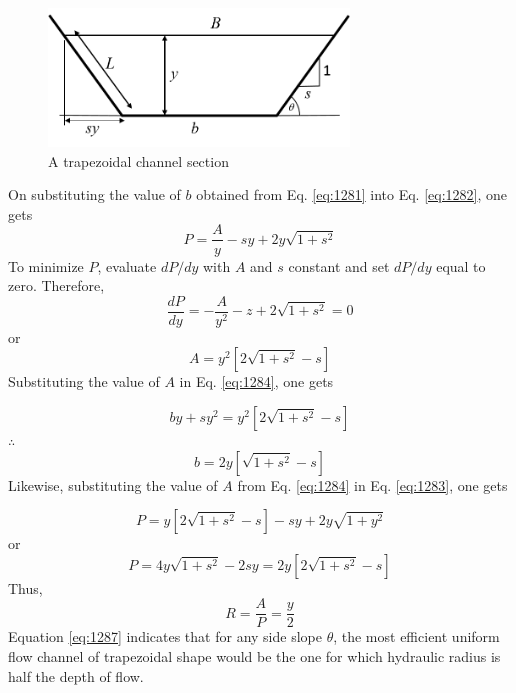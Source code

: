 \documentclass[a4paper, 12pt, british]{article} %
\numberwithin{equation}{section}
\numberwithin{figure}{section}
\numberwithin{table}{section}
\begin{document}
\begin{figure}[H]
	\centering
	\includegraphics[width=8cm]{./images/section_trap_2018_a.png}
	\caption{A trapezoidal channel section}
	\label{fig:section_trap_2018}
\end{figure}
On substituting the value of $b$ obtained from Eq. \ref{eq:1281}
into Eq. \ref{eq:1282}, one gets
\begin{equation}
P = \frac{A}{y} - sy +2y \sqrt{1 + s^2}
\label{eq:1283}
\end{equation}	
To minimize $P$, evaluate $dP/dy$ with $A$ and $s$ constant
and set $dP/dy$ equal to zero. Therefore, 
\begin{equation*}
\frac{dP}{dy} = -\frac{A}{y^2} - z + 2 \sqrt{1 + s^2} = 0
\end{equation*}
or
\begin{equation}
A = y^2 \left [ 2 \sqrt{1 + s^2} - s \right ]
\label{eq:1284}
\end{equation}
Substituting the value of $A$ in Eq. \ref{eq:1284}, one gets 

\begin{equation*}
by + sy^2 = y^2 \left [ 2 \sqrt{1 + s^2} - s \right ]
\end{equation*}
$\therefore$
\begin{equation}
b = 2y  \left [ \sqrt{1 + s^2} - s \right ]
\label{eq:1285}
\end{equation}
Likewise, substituting the value of $A$ from Eq. \ref{eq:1284} in
Eq. \ref{eq:1283}, one gets

\begin{equation*}
P = y \left [ 2 \sqrt{1 + s^2} - s \right ] - sy + 2y \sqrt{1 + y^2}
\end{equation*}
or
\begin{equation}
P = 4y \sqrt{1 + s^2} - 2sy = 2y\left [ 2 \sqrt{1 + s^2} - s \right ]
\label{eq:1286}
\end{equation}
Thus,
\begin{equation}
R = \frac{A}{P} = \frac{y}{2}
\label{eq:1287}
\end{equation}
Equation  \ref{eq:1287} indicates that for any side slope $\theta$, 
the most efficient uniform flow channel of trapezoidal
shape would be the one for which hydraulic radius is
half the depth of flow. 
\end{document}
